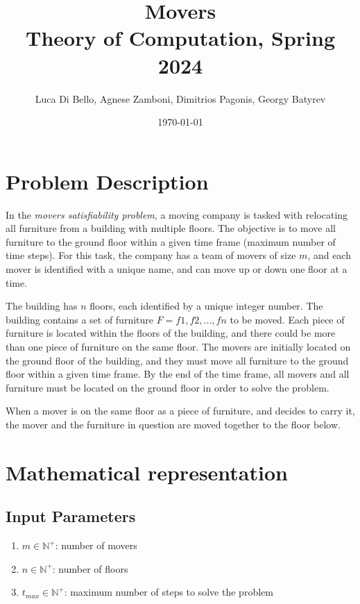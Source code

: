 \documentclass[a4paper, 11pt]{article}
\title{Movers \\[1ex] \large Theory of Computation, Spring 2024}
\author{Luca Di Bello, Agnese Zamboni, Dimitrios Pagonis, Georgy Batyrev}
\date{\today}
\begin{document}
\maketitle
\tableofcontents

\pagebreak

\section{Problem Description}

In the \textit{movers satisfiability problem}, a moving company is tasked with relocating all furniture from a building with multiple floors. The objective is to move all furniture to the ground floor within a given time frame (maximum number of time steps). For this task, the company has a team of movers of size $m$, and each mover is identified with a unique name, and can move up or down one floor at a time.

The building has $n$ floors, each identified by a unique integer number. The building contains a set of furniture $F = {f1,f2,...,fn}$ to be moved. Each piece of furniture is located within the floors of the building, and there could be more than one piece of furniture on the same floor. The movers are initially located on the ground floor of the building, and they must move all furniture to the ground floor within a given time frame. By the end of the time frame, all movers and all furniture must be located on the ground floor in order to solve the problem.

When a mover is on the same floor as a piece of furniture, and decides to carry it, the mover and the furniture in question are moved together to the floor below.

\pagebreak

\section{Mathematical representation}

\subsection{Input Parameters}

\begin{enumerate}
	\item $m \in \mathbb{N}^+$: number of movers
	\item $n \in \mathbb{N}^+$: number of floors
	\item $t_{max} \in \mathbb{N}^+$: maximum number of steps to solve the problem
\end{enumerate}
\end{document}
